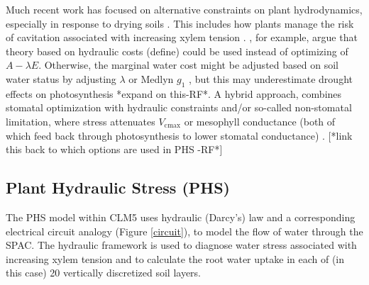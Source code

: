 \documentclass[draft,linenumbers]{agujournal}
\begin{document}
    
     Much recent work has focused on alternative constraints on plant hydrodynamics, especially in response to drying soils \citep{manzoni2013b,novick2016a,zhou2014}.
    This includes how plants manage the risk of cavitation associated with increasing xylem tension \citep{sperry1998}.
    \citep{sperry2017}, for example, argue that theory based on hydraulic costs (define) could be used instead of optimizing of $A-\lambda E$.  
    Otherwise, the marginal water cost might be adjusted based on  soil water status  by adjusting $\lambda$ or Medlyn $g_1$ \citep{manzoni2013b}, but this may underestimate drought effects on photosynthesis *expand on this-RF*\citep{zhou2013,lin2018}.
    A hybrid approach, combines stomatal optimization with hydraulic constraints and/or
    so-called non-stomatal limitation, where stress attenuates $V_{\text{cmax}}$ or mesophyll conductance (both of which feed back through photosynthesis to lower stomatal conductance) \citep{egea2011,novick2016a}. [*link this back to which options are used in PHS -RF*]

    
\subsection{Plant Hydraulic Stress (PHS)}
  The PHS model within CLM5 uses hydraulic (Darcy's) law and a corresponding electrical circuit analogy (Figure \ref{circuit}), to model the flow of water through the SPAC. The hydraulic framework is used to diagnose water stress associated with increasing xylem tension
  and to calculate the root water uptake in each of (in this case) 20 vertically discretized soil layers.
\end{document}
